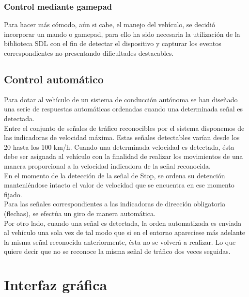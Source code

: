 \documentclass[a4paper,12pt]{article}
\begin{document}
\subsubsection{Control mediante gamepad}

Para hacer más cómodo, aún si cabe, el manejo del vehículo, se decidió incorporar un mando o gamepad, para ello ha sido necesaria la utilización de la biblioteca SDL con el fin de detectar el dispositivo y capturar los eventos correspondientes no presentando dificultades destacables. 

\subsection{Control automático}

Para dotar al vehículo de un sistema de conducción autónoma se han diseñado una serie de respuestas automáticas ordenadas cuando una determinada señal es detectada.\\

Entre el conjunto de señales de tráfico reconocibles por el sistema disponemos de las indicadoras de velocidad máxima. Estas señales detectables varían desde los 20 hasta los 100 km/h. Cuando una determinada velocidad es detectada, ésta debe ser asignada al vehículo con la finalidad de realizar los movimientos de una manera proporcional a la velocidad indicadora de la señal reconocida. \\

En el momento de la detección de la señal de Stop, se ordena su detención manteniéndose intacto el valor de velocidad que se encuentra en ese momento fijado.\\

Para las señales correspondientes a las indicadoras de dirección obligatoria (flechas), se efectúa un giro de manera automática.\\

Por otro lado, cuando una señal es detectada, la orden automatizada es enviada al vehículo una sola vez de tal modo que si en el entorno apareciese más adelante la misma señal reconocida anteriormente, ésta no se volverá a realizar. Lo que quiere decir que no se reconoce la misma señal de tráfico dos veces seguidas. \\

\section{Interfaz gráfica}
\end{document}
